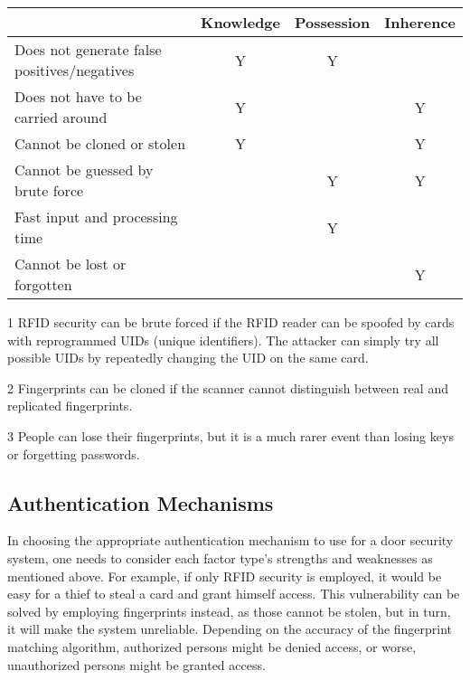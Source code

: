 \begin{table}[h]
	\begin{threeparttable}
		\begin{tabular}{|l|c|c|c|}
			\hline		                                & Knowledge & Possession & Inherence  \\ \hline
			Does not generate false positives/negatives & Y         & Y          &            \\
			Does not have to be carried around          & Y         &            & Y          \\
			Cannot be cloned or stolen                  & Y         &            & Y\tnote{2} \\
			Cannot be guessed by brute force            &           & Y\tnote{1} & Y          \\
			Fast input and processing time              &           & Y          &            \\
			Cannot be lost or forgotten                 &           &            & Y\tnote{3} \\ \hline
		\end{tabular}
		\begin{tablenotes}
		    \item[1] RFID security can be brute forced if the RFID reader can be spoofed by cards with reprogrammed UIDs (unique identifiers). The attacker can simply try all possible UIDs by repeatedly changing the UID on the same card.
		    \item[2] Fingerprints can be cloned if the scanner cannot distinguish between real and replicated fingerprints.
		    \item[3] People can lose their fingerprints, but it is a much rarer event than losing keys or forgetting passwords.
		\end{tablenotes}
	\end{threeparttable}
\end{table}

\subsection{Authentication Mechanisms} %

In choosing the appropriate authentication mechanism to use for a door security system, one needs to consider each factor type's strengths and weaknesses as mentioned above. For example, if only RFID security is employed, it would be easy for a thief to steal a card and grant himself access. This vulnerability can be solved by employing fingerprints instead, as those cannot be stolen, but in turn, it will make the system unreliable. Depending on the accuracy of the fingerprint matching algorithm, authorized persons might be denied access, or worse, unauthorized persons might be granted access.

